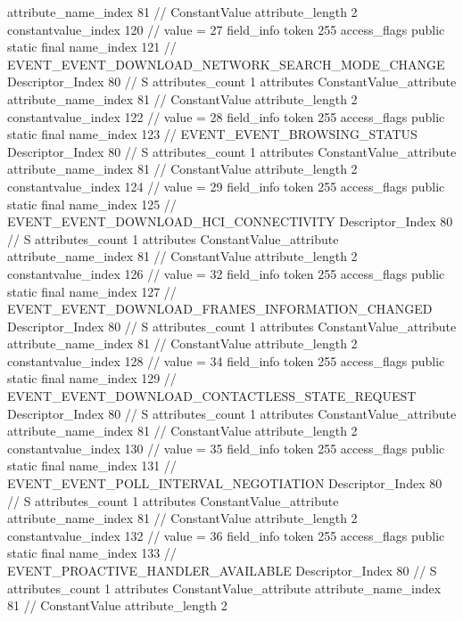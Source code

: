{{{{{{{					attribute_name_index	81		// ConstantValue
					attribute_length	2
					constantvalue_index	120		// value = 27
				}
				}
			}
			field_info {
				token	255
				access_flags	public static final
				name_index	121		// EVENT_EVENT_DOWNLOAD_NETWORK_SEARCH_MODE_CHANGE
				Descriptor_Index	80		// S
				attributes_count	1
				attributes {
				ConstantValue_attribute {
					attribute_name_index	81		// ConstantValue
					attribute_length	2
					constantvalue_index	122		// value = 28
				}
				}
			}
			field_info {
				token	255
				access_flags	public static final
				name_index	123		// EVENT_EVENT_BROWSING_STATUS
				Descriptor_Index	80		// S
				attributes_count	1
				attributes {
				ConstantValue_attribute {
					attribute_name_index	81		// ConstantValue
					attribute_length	2
					constantvalue_index	124		// value = 29
				}
				}
			}
			field_info {
				token	255
				access_flags	public static final
				name_index	125		// EVENT_EVENT_DOWNLOAD_HCI_CONNECTIVITY
				Descriptor_Index	80		// S
				attributes_count	1
				attributes {
				ConstantValue_attribute {
					attribute_name_index	81		// ConstantValue
					attribute_length	2
					constantvalue_index	126		// value = 32
				}
				}
			}
			field_info {
				token	255
				access_flags	public static final
				name_index	127		// EVENT_EVENT_DOWNLOAD_FRAMES_INFORMATION_CHANGED
				Descriptor_Index	80		// S
				attributes_count	1
				attributes {
				ConstantValue_attribute {
					attribute_name_index	81		// ConstantValue
					attribute_length	2
					constantvalue_index	128		// value = 34
				}
				}
			}
			field_info {
				token	255
				access_flags	public static final
				name_index	129		// EVENT_EVENT_DOWNLOAD_CONTACTLESS_STATE_REQUEST
				Descriptor_Index	80		// S
				attributes_count	1
				attributes {
				ConstantValue_attribute {
					attribute_name_index	81		// ConstantValue
					attribute_length	2
					constantvalue_index	130		// value = 35
				}
				}
			}
			field_info {
				token	255
				access_flags	public static final
				name_index	131		// EVENT_EVENT_POLL_INTERVAL_NEGOTIATION
				Descriptor_Index	80		// S
				attributes_count	1
				attributes {
				ConstantValue_attribute {
					attribute_name_index	81		// ConstantValue
					attribute_length	2
					constantvalue_index	132		// value = 36
				}
				}
			}
			field_info {
				token	255
				access_flags	public static final
				name_index	133		// EVENT_PROACTIVE_HANDLER_AVAILABLE
				Descriptor_Index	80		// S
				attributes_count	1
				attributes {
				ConstantValue_attribute {
					attribute_name_index	81		// ConstantValue
					attribute_length	2
}}}}}}}
